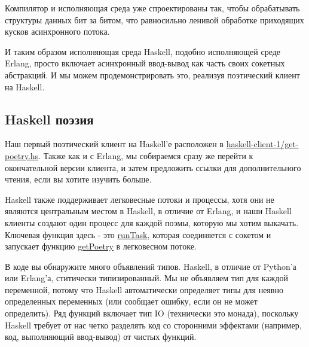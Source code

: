 Компилятор и 
исполняющая среда уже спроектированы так, чтобы обрабатывать 
структуры данных бит за битом, что равносильно ленивой обработке  
приходящих кусков асинхронного потока. 


И таким образом исполняющая среда Haskell, подобно исполняющей 
среде Erlang, просто включает асинхронный ввод-вывод как часть 
своих сокетных абстракций. И мы можем продемонстрировать это, 
реализуя поэтический клиент на Haskell.


\subsection{Haskell поэзия}


Наш первый поэтический клиент на Haskell'е расположен в 
\href{https://github.com/jdavisp3/twisted-intro/blob/master/haskell-client-1/get-poetry.hs}{haskell-client-1/get-poetry.hs}. 
Также как и с Erlang, мы собираемся сразу же перейти к окончательной версии 
клиента, и затем предложить ссылки для дополнительного чтения, если вы 
хотите изучить больше.


Haskell также поддерживает легковесные потоки и процессы, хотя 
они не являются центральным местом в Haskell, в отличие от Erlang, 
и наши Haskell клиенты создают один процесс для каждой 
поэмы, которую мы хотим выкачать. Ключевая функция здесь - это 
\href{https://github.com/jdavisp3/twisted-intro/blob/master/haskell-client-1/get-poetry.hs#L64}{runTask}, 
которая соединяется с сокетом и запускает функцию 
\href{https://github.com/jdavisp3/twisted-intro/blob/master/haskell-client-1/get-poetry.hs#L48}{getPoetry} 
в легковесном потоке.


В коде вы обнаружите много объявлений типов. Haskell, в отличие от Python'а  
или Erlang'а, ститически типизированный. Мы не объявляем тип для каждой 
переменной, потому что Haskell автоматически определяет типы для неявно 
определенных переменных (или сообщает ошибку, если он не может определить). 
Ряд функций включает тип IO (технически это монада), поскольку Haskell 
требует от нас четко разделять код со сторонними эффектами (например, 
код, выполняющий ввод-вывод) от чистых функций.



